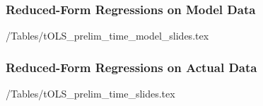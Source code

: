 \begin{frame}
\frametitle{\textbf{Reduced-Form Regressions on Model Data}}

{\small{}}

 \econtexRoot/Tables/tOLS_prelim_time_model_slides.tex

\end{frame}


\begin{frame}
\frametitle{\textbf{Reduced-Form Regressions on Actual Data}}

{\small{}}

 \econtexRoot/Tables/tOLS_prelim_time_slides.tex

\end{frame}


